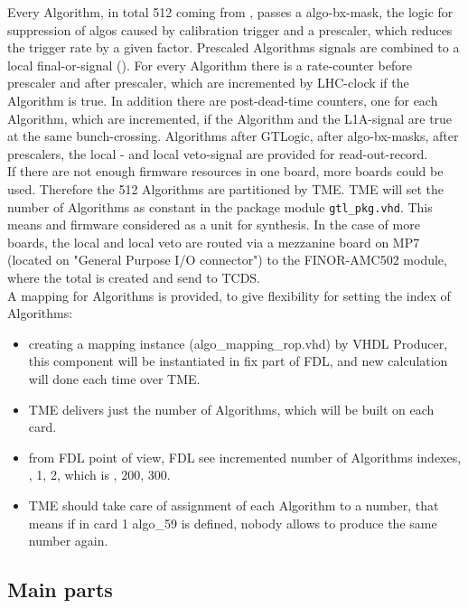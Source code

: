 Every Algorithm, in total 512 coming from \ugtl, passes a algo-bx-mask, the logic for suppression of algos caused by calibration trigger and a prescaler, which reduces the trigger rate by a given factor. Prescaled Algorithms signals are combined to a local final-or-signal (\finor).
For every Algorithm there is a rate-counter before prescaler and after prescaler, which are incremented by LHC-clock if the Algorithm is true. In addition there are post-dead-time counters, one for each Algorithm, which are incremented,
if the Algorithm and the L1A-signal are true at the same bunch-crossing.
Algorithms after GTLogic, after algo-bx-masks, after prescalers, the local \finor- and local veto-signal are provided for read-out-record.\\
If there are not enough firmware resources in one \ugt board, more boards could be used. Therefore the 512 Algorithms are partitioned by TME. TME will set the number of Algorithms as
constant in the package module \texttt{gtl\_pkg.vhd}. This means \ugtl and \ufdl firmware considered as a unit for synthesis. In the case of more \ugt boards, the local \finor and local veto are routed via
a mezzanine board on MP7 (located on "General Purpose I/O connector") to the FINOR-AMC502 module, where the total \finor is created and send to TCDS.\\
A mapping for Algorithms is provided, to give flexibility for setting the index of Algorithms:
\begin {itemize}
\item creating a mapping instance (algo\_mapping\_rop.vhd) by VHDL Producer, this component will be instantiated in fix part of FDL, and new calculation will done each time over TME.
\item TME delivers just the number of Algorithms, which will be built on each card.
\item from FDL point of view, FDL see incremented number of Algorithms indexes, , 1, 2, which is , 200, 300.
\item TME should take care of assignment of each Algorithm to a number, that means if in card 1 algo\_59 is defined, nobody allows to produce the same number again.
\end {itemize}

\subsection{Main parts}

